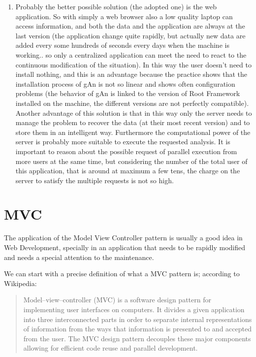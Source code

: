 \begin{enumerate}
\item
Probably the better possible solution (the adopted one) is the web application. So with simply a web browser also a low quality laptop can access information, and both the data and the application are always at the last version (the application change quite rapidly, but actually new data are added every some hundreds of seconds every days when the machine is working.. so only a centralized application can meet the need to react to the continuous modification of the situation).
In this way the user doesn't need to install nothing, and this is an advantage because the practice shows that the installation process of gAn is not so linear and shows often configuration problems (the behavior of gAn is linked to the version of Root Framework installed on the machine, the different versions are not perfectly compatible). Another advantage of this solution is that in this way only the server needs to manage the problem to recover the data (at their most recent version) and to store them in an intelligent way. Furthermore the computational power of the server is probably more suitable to execute the requested analysis. It is important to reason about the possible request of parallel execution from more users at the same time, but considering the number of the total user of this application, that is around at maximum a few tens, the charge on the server to satisfy the multiple requests is not so high.    

\end{enumerate}
 
\section{MVC}

The application of the Model View Controller pattern is usually a good idea in Web Development, specially in an application that needs to be rapidly modified and needs a special attention to the maintenance.

We can start with a precise definition of what a MVC pattern is; according to Wikipedia:

\begin{quote} 

Model–view–controller (MVC) is a software design pattern for implementing user interfaces on computers. It divides a given application into three interconnected parts in order to separate internal representations of information from the ways that information is presented to and accepted from the user. The MVC design pattern decouples these major components allowing for efficient code reuse and parallel development.

\end{quote}

